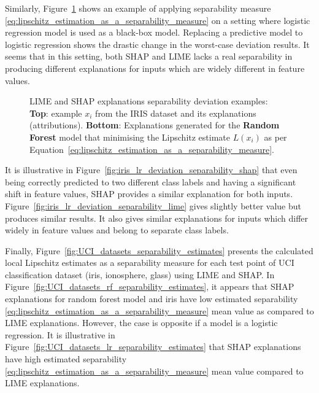 \documentclass[english]{tktltiki2}
\theoremstyle{definition}
\theoremstyle{remark}
\begin{document}
Similarly, Figure~\ref{fig:iris_lr_deviation_separability} shows an example of applying separability measure \eqref{eq:lipschitz_estimation_as_a_separability_measure} on a setting where logistic regression model is used as a black-box model. Replacing a predictive model to logistic regression shows the drastic change in the worst-case deviation results. It seems that in this setting, both SHAP and LIME lacks a real separability in producing different explanations for inputs which are widely different in feature values.
\begin{figure}[H]
	\hspace*{\fill}%
	\caption{LIME and SHAP explanations separability deviation examples: \textbf{Top}: example $x_i$ from the IRIS dataset and its explanations (attributions). \textbf{Bottom}: Explanations generated for the \textbf{Random Forest} model that minimising the Lipschitz estimate $L(x_i)$ as per Equation~\eqref{eq:lipschitz_estimation_as_a_separability_measure}.}%
	\label{fig:iris_lr_deviation_separability}%
\end{figure}

It is illustrative in Figure~\ref{fig:iris_lr_deviation_separability_shap} that even being correctly predicted to two different class labels and having a significant shift in feature values, SHAP provides a similar explanation for both inputs. Figure~\ref{fig:iris_lr_deviation_separability_lime} gives slightly better value but produces similar results. It also gives similar explanations for inputs which differ widely in feature values and belong to separate class labels.

Finally, Figure~\ref{fig:UCI_datasets_separability_estimates} presents the calculated local Lipschitz estimates as a separability measure for each test point of UCI classification dataset (iris, ionosphere, glass) using LIME and SHAP. In Figure~\ref{fig:UCI_datasets_rf_separability_estimates}, it appears that SHAP explanations for random forest model and iris have low estimated separability \eqref{eq:lipschitz_estimation_as_a_separability_measure} mean value as compared to LIME explanations. However, the case is opposite if a model is a logistic regression. It is illustrative in Figure~\ref{fig:UCI_datasets_lr_separability_estimates} that SHAP explanations have high estimated separability \eqref{eq:lipschitz_estimation_as_a_separability_measure} mean value compared to LIME explanations.
\end{document}
